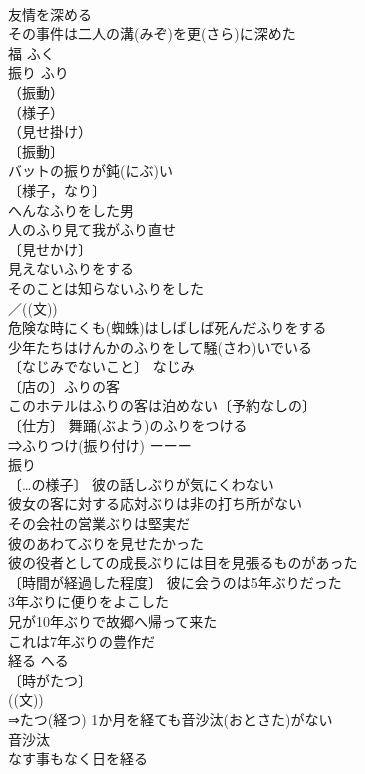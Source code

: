 \documentclass[8pt]{extreport}
\begin{document}
\begin{CJK}{UTF8}{min}
\\	友情を深める 
\\	その事件は二人の溝(みぞ)を更(さら)に深めた 
\\	福	ふく	
\\	振り	ふり	
\\	（振動）
\\	（様子）
\\	（見せ掛け）
\\	〔振動〕
\\	バットの振りが鈍(にぶ)い 
\\	〔様子，なり〕
\\	へんなふりをした男 
\\	人のふり見て我がふり直せ 
\\	〔見せかけ〕
\\	見えないふりをする 
\\	そのことは知らないふりをした 
\\	／((文)) 
\\	危険な時にくも(蜘蛛)はしばしば死んだふりをする 
\\	少年たちはけんかのふりをして騒(さわ)いでいる 
\\	〔なじみでないこと〕 なじみ　
\\	〔店の〕ふりの客 
\\	このホテルはふりの客は泊めない〔予約なしの〕 
\\	〔仕方〕 舞踊(ぶよう)のふりをつける 
\\	⇒ふりつけ(振り付け) ーーー 
\\	振り 
\\	〔…の様子〕 彼の話しぶりが気にくわない 
\\	彼女の客に対する応対ぶりは非の打ち所がない 
\\	その会社の営業ぶりは堅実だ 
\\	彼のあわてぶりを見せたかった 
\\	彼の役者としての成長ぶりには目を見張るものがあった 
\\	〔時間が経過した程度〕 彼に会うのは5年ぶりだった 
\\	3年ぶりに便りをよこした 
\\	兄が10年ぶりで故郷へ帰って来た 
\\	これは7年ぶりの豊作だ 
\\	経る	へる	
\\	〔時がたつ〕
\\	((文)) 
\\	⇒たつ(経つ) 1か月を経ても音沙汰(おとさた)がない 
\\	音沙汰　
\\	なす事もなく日を経る 

\end{CJK}
\end{document}
